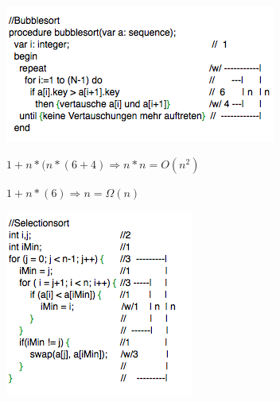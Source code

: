 \documentclass{article}
\begin{document}

\includegraphics{bubblesortallgemein}

$1+n*(n*(6+4) \Rightarrow n*n = O(n^2)$

$1+n*(6)     \Rightarrow  n   = \Omega(n)$
\newpage

\includegraphics{selectionsortallgemein}
\end{document}
